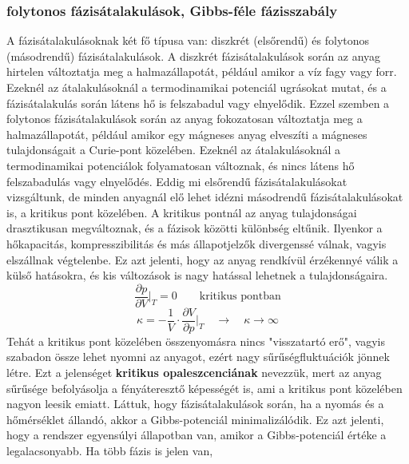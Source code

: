 \documentclass[../main.tex]{subfiles}
\begin{document}
\subsubsection{folytonos fázisátalakulások, Gibbs-féle fázisszabály}
A fázisátalakulásoknak két fő típusa van: diszkrét (elsőrendű) és folytonos (másodrendű) fázisátalakulások.
A diszkrét fázisátalakulások során az anyag hirtelen változtatja meg a halmazállapotát, például amikor a víz fagy vagy forr. Ezeknél az átalakulásoknál a termodinamikai potenciál
ugrásokat mutat, és a fázisátalakulás során látens hő is felszabadul vagy elnyelődik.
Ezzel szemben a folytonos fázisátalakulások során az anyag fokozatosan változtatja meg a halmazállapotát, például amikor egy mágneses anyag elveszíti a mágneses tulajdonságait a Curie-pont
közelében. Ezeknél az átalakulásoknál a termodinamikai potenciálok folyamatosan változnak, és nincs látens hő felszabadulás vagy elnyelődés.
\newline
\newline
Eddig mi elsőrendű fázisátalakulásokat vizsgáltunk, de minden anyagnál elő lehet idézni másodrendű fázisátalakulásokat is, a kritikus pont közelében.
A kritikus pontnál az anyag tulajdonságai drasztikusan megváltoznak, és a fázisok közötti különbség eltűnik. Ilyenkor a hőkapacitás, kompresszibilitás és más állapotjelzők
divergenssé válnak, vagyis elszállnak végtelenbe. Ez azt jelenti, hogy az anyag rendkívül érzékennyé válik a külső hatásokra, és kis változások is nagy hatással lehetnek a tulajdonságaira.
\begin{equation}
    \frac{\partial p}{\partial V}\bigg|_{T} = 0 \qquad \text{kritikus pontban}
\end{equation}
\begin{equation}
    \kappa = - \frac{1}{V} \cdot \frac{\partial V}{\partial p}\bigg|_{T} \quad \to \quad \kappa \to \infty
\end{equation}
Tehát a kritikus pont közelében összenyomásra nincs "visszatartó erő", vagyis szabadon össze lehet nyomni az anyagot, ezért nagy sűrűségfluktuációk jönnek létre.
Ezt a jelenséget \textbf{kritikus opaleszcenciának} nevezzük, mert az anyag sűrűsége befolyásolja a fényáteresztő képességét is, ami a kritikus pont közelében nagyon leesik emiatt.
\newline
\newline
Láttuk, hogy fázisátalakulások során, ha a nyomás és a hőmérséklet állandó, akkor a Gibbs-potenciál minimalizálódik.
Ez azt jelenti, hogy a rendszer egyensúlyi állapotban van, amikor a Gibbs-potenciál értéke a legalacsonyabb. Ha több fázis is jelen van,
\end{document}
